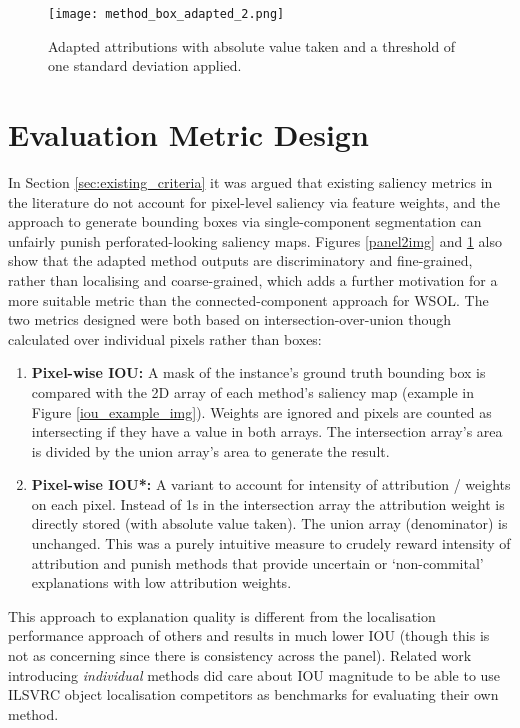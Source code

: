 \documentclass[main]{subfiles}
\begin{document}
\begin{figure}[htbp]
\centering
\texttt{[image: method\_box\_adapted\_2.png]}
\caption{Adapted attributions with absolute value taken and a threshold of one standard deviation applied.}
\label{panel3img}
\end{figure}


\newpage


\section{Evaluation Metric Design} \label{sec:metric}

In Section \ref{sec:existing_criteria} it was argued that existing saliency metrics in the literature do not account for pixel-level saliency via feature weights, and the approach to generate bounding boxes via single-component segmentation can unfairly punish perforated-looking saliency maps. Figures \ref{panel2img} and \ref{panel3img} also show that the adapted method outputs are discriminatory and fine-grained, rather than localising and coarse-grained, which adds a further motivation for a more suitable metric than the connected-component approach for WSOL. The two metrics designed were both based on intersection-over-union though calculated over individual pixels rather than boxes:

\begin{enumerate}
\item \textbf{Pixel-wise IOU:} A mask of the instance's ground truth bounding box is compared with the 2D array of each method's saliency map (example in Figure \ref{iou_example_img}). Weights are ignored and pixels are counted as intersecting if they have a value in both arrays. The intersection array's area is divided by the union array's area to generate the result.

\item \textbf{Pixel-wise IOU*:} A variant to account for intensity of attribution / weights on each pixel. Instead of 1s in the intersection array the attribution weight is directly stored (with absolute value taken). The union array (denominator) is unchanged. This was a purely intuitive measure to crudely reward intensity of attribution and punish methods that provide uncertain or `non-commital' explanations with low attribution weights.

\end{enumerate}

This approach to explanation quality is different from the localisation performance approach of others and results in much lower IOU (though this is not as concerning since there is consistency across the panel). Related work introducing \textit{individual} methods did care about IOU magnitude to be able to use ILSVRC object localisation competitors as benchmarks for evaluating their own method.
\end{document}

